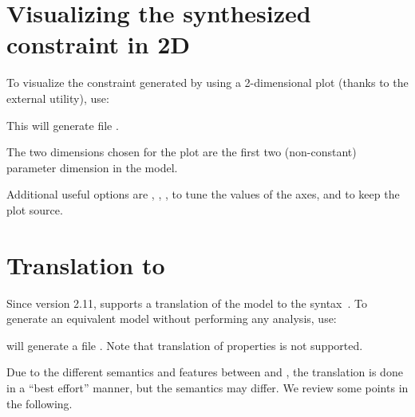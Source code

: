 \section{Visualizing the synthesized constraint in 2D}

To visualize the constraint generated by \imitator{} using a 2-dimensional plot (thanks to the external  utility), use:


This will generate file .

The two dimensions chosen for the plot are the first two (non-constant) parameter dimension in the model.

Additional useful options are
,
,
,
to tune the values of the axes,
and  to keep the plot source.


\section{Translation to \uppaal{}}\label{section:uppaal}

Since version 2.11, \imitator{} supports a translation of the model to the \uppaal{} syntax~\cite{LPY97}.
To generate an equivalent \uppaal{} model without performing any analysis, use:


\imitator{} will generate a file .
Note that translation of properties is not supported.

Due to the different semantics and features between \imitator{} and \uppaal{}, the translation is done in a ``best effort'' manner, but the semantics may differ.
We review some points in the following.

